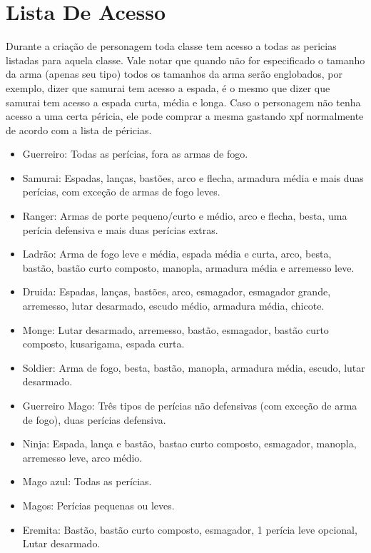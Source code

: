 \section{Lista De Acesso}

Durante a criação de personagem toda classe tem acesso a todas as pericias listadas para aquela classe. Vale notar que quando não for especificado o tamanho da arma (apenas seu tipo) todos os tamanhos da arma serão englobados, por exemplo, dizer que samurai tem acesso a espada, é o mesmo que dizer que samurai tem acesso a espada curta, média e longa. Caso o personagem não tenha acesso a uma certa péricia, ele pode comprar a mesma gastando xpf normalmente de acordo com a lista de péricias.


\begin{itemize}
	\item Guerreiro: Todas as perícias, fora as armas de fogo.
	
	\item Samurai: Espadas, lanças, bastões, arco e flecha, armadura média e mais duas perícias, com exceção de armas de fogo leves.

	\item Ranger: Armas de porte pequeno/curto e médio, arco e flecha, besta, uma perícia defensiva e mais duas perícias extras.

	\item Ladrão: Arma de fogo leve e média, espada média e curta, arco, besta, bastão, bastão curto composto, manopla, armadura média e arremesso leve.

	\item Druida: Espadas, lanças, bastões, arco, esmagador, esmagador grande, arremesso, lutar desarmado, escudo médio, armadura média, chicote.

	\item Monge: Lutar desarmado, arremesso, bastão, esmagador, bastão curto composto, kusarigama, espada curta.

	\item Soldier: Arma de fogo, besta, bastão, manopla, armadura média, escudo, lutar desarmado.

	\item Guerreiro Mago: Três tipos de perícias não defensivas (com exceção de arma de fogo), duas perícias defensiva.

	\item Ninja: Espada, lança e bastão, bastao curto composto, esmagador, manopla, arremesso leve, arco médio.

	\item Mago azul: Todas as perícias.

	\item Magos: Perícias pequenas ou leves.
	
	\item Eremita: Bastão, bastão curto composto, esmagador, 1 perícia leve opcional, Lutar desarmado.
	
\end{itemize}



